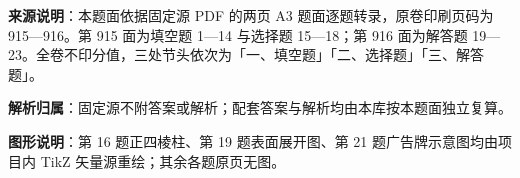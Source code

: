 

\begin{gknotice}
\textbf{来源说明}：本题面依据固定源 PDF 的两页 A3 题面逐题转录，原卷印刷页码为 915—916。第 915 面为填空题 1—14 与选择题 15—18；第 916 面为解答题 19—23。全卷不印分值，三处节头依次为「一、填空题」「二、选择题」「三、解答题」。

\textbf{解析归属}：固定源不附答案或解析；配套答案与解析均由本库按本题面独立复算。

\textbf{图形说明}：第 16 题正四棱柱、第 19 题表面展开图、第 21 题广告牌示意图均由项目内 TikZ 矢量源重绘；其余各题原页无图。
\end{gknotice}


